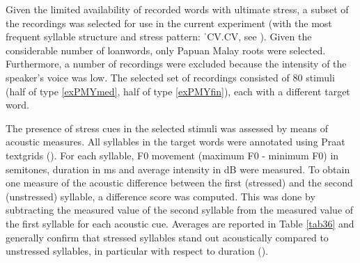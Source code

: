 \ea
{}
    \z
\z

Given the limited availability of recorded words with ultimate stress, a subset of the recordings was selected for use in the current experiment (with the most frequent syllable structure and stress pattern: ˈCV.CV, see \citealt{kluge_grammar_2017}). Given the considerable number of loanwords, only Papuan Malay roots were selected. Furthermore, a number of recordings were excluded because the intensity of the speaker's voice was low. The selected set of recordings consisted of 80 stimuli (half of type \ref{exPMYmed}, half of type \ref{exPMYfin}), each with a different target word.

The presence of stress cues in the selected stimuli was assessed by means of acoustic measures. All syllables in the target words were annotated using Praat textgrids (\citealt{boersma_praat_2019}). For each syllable, F0 movement (maximum F0 - minimum F0) in semitones, duration in ms and average intensity in dB were measured. To obtain one measure of the acoustic difference between the first (stressed) and the second (unstressed) syllable, a difference score was computed. This was done by subtracting the measured value of the second syllable from the measured value of the first syllable for each acoustic cue. Averages are reported in Table \ref{tab36} and generally confirm that stressed syllables stand out acoustically compared to unstressed syllables, in particular with respect to duration ().

